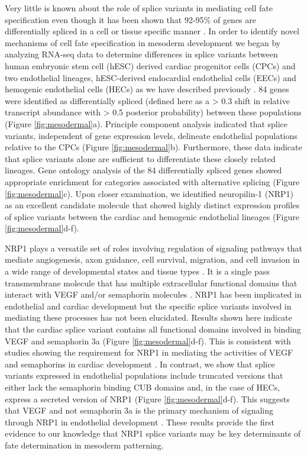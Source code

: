 \documentclass[twocolumn]{article}
\begin{document}
Very little is known about the role of splice variants in mediating cell fate
specification even though it has been shown that 92-95\% of genes are
differentially spliced in a cell or tissue specific manner \cite{Wang:2008ea,
Pan:2008jq}. In order to identify novel mechanisms of cell fate specification in
mesoderm development we began by analyzing RNA-seq data to determine differences
in splice variants between human embryonic stem cell (hESC) derived cardiac
progenitor cells (CPCs) and two endothelial lineages, hESC-derived endocardial
endothelial cells (EECs) and hemogenic endothelial cells (HECs) as we have
described previously \cite{Palpant:2015dv}. 84 genes were identified as
differentially spliced (defined here as a > 0.3 shift in relative transcript
abundance with > 0.5 posterior probability) between these populations (Figure
\ref{fig:mesodermal}a).  Principle component analysis indicated that splice
variants, independent of gene expression levels, delineate endothelial
populations relative to the CPCs (Figure \ref{fig:mesodermal}b). Furthermore,
these data indicate that splice variants alone are sufficient to differentiate
these closely related lineages.  Gene ontology analysis of the 84 differentially
spliced genes showed appropriate enrichment for categories associated with
alternative splicing (Figure \ref{fig:mesodermal}c). Upon closer examination, we
identified neuropilin-1 (NRP1) as an excellent candidate molecule that showed
highly distinct expression profiles of splice variants between the cardiac and
hemogenic endothelial lineages (Figure \ref{fig:mesodermal}d-f).

NRP1 plays a versatile set of roles involving regulation of signaling pathways
that mediate angiogenesis, axon guidance, cell survival, migration, and cell
invasion in a wide range of developmental states and tissue types
\cite{Zachary:2011dr}. It is a single pass transmembrane molecule that has
multiple extracellular functional domains that interact with VEGF and/or
semaphorin molecules \cite{Cackowski:2004ja}. NRP1 has been implicated in
endothelial \cite{Lee:2002dh} and cardiac \cite{Gu:2003vq} development but the
specific splice variants involved in mediating these processes has not been
elucidated.  Results shown here indicate that the cardiac splice variant
contains all functional domains involved in binding VEGF and semaphorin 3a
(Figure \ref{fig:mesodermal}d-f). This is consistent with studies showing the
requirement for NRP1 in mediating the activities of VEGF and semaphorins in
cardiac development \cite{Gu:2003vq}. In contrast, we show that splice variants
expressed in endothelial populations include truncated versions that either lack
the semaphorin binding CUB domains and, in the case of HECs, express a secreted
version of NRP1 (Figure \ref{fig:mesodermal}d-f). This suggests that VEGF and
not semaphorin 3a is the primary mechanism of signaling through NRP1 in
endothelial development \cite{Lee:2002dh}. These results provide the first
evidence to our knowledge that NRP1 splice variants may be key determinants of
fate determination in mesoderm patterning.
\end{document}
